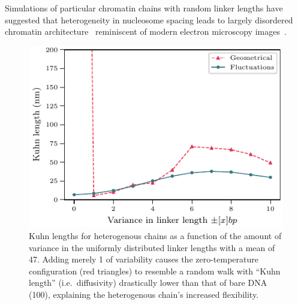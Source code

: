 \documentclass[%
 reprint,
superscriptaddress,
showpacs,preprintnumbers,
 amsmath,amssymb,
 aps,
 prl,
]{revtex4-1}
\begin{document}
Simulations of particular chromatin chains with random linker lengths have
    suggested that heterogeneity in nucleosome spacing leads to largely
    disordered chromatin architecture~\cite{woodcock1993,
    collepardo-guevara2014, bascom2017a} reminiscent of modern electron
    microscopy images~\cite{ou2017}.

\begin{figure}[t]
    \centering
    \includegraphics{./figures/fig4_kuhn_length_vs_window_size_mu47bp.pdf}
    \caption{Kuhn lengths for heterogenous chains as a function of
     the amount of variance in the uniformly distributed linker lengths with a mean
     of \SI{47}{\basepair}. Adding merely \SI{1}{\basepair} of variability causes the
     zero-temperature configuration (red triangles) to resemble a random walk with ``Kuhn
     length'' (i.e.\ diffusivity) drastically lower than that of bare DNA
     (\SI{100}{\basepair}), explaining the heterogenous chain's increased
    flexibility.}\label{fig:box-kuhns}
\end{figure}
\end{document}
